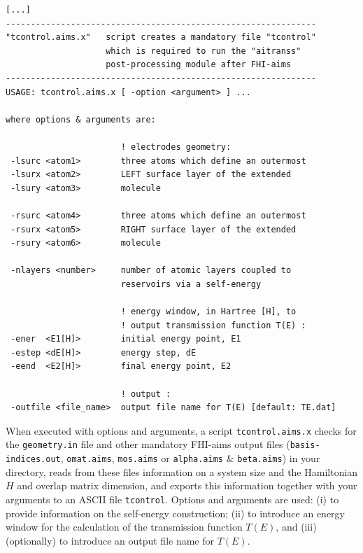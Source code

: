 \begin{verbatim}
[...]
--------------------------------------------------------------
"tcontrol.aims.x"   script creates a mandatory file "tcontrol"
                    which is required to run the "aitranss"
                    post-processing module after FHI-aims
--------------------------------------------------------------
USAGE: tcontrol.aims.x [ -option <argument> ] ...

where options & arguments are:

                       ! electrodes geometry:
 -lsurc <atom1>        three atoms which define an outermost
 -lsurx <atom2>        LEFT surface layer of the extended
 -lsury <atom3>        molecule

 -rsurc <atom4>        three atoms which define an outermost
 -rsurx <atom5>        RIGHT surface layer of the extended
 -rsury <atom6>        molecule

 -nlayers <number>     number of atomic layers coupled to 
                       reservoirs via a self-energy

                       ! energy window, in Hartree [H], to
                       ! output transmission function T(E) :
 -ener  <E1[H]>        initial energy point, E1
 -estep <dE[H]>        energy step, dE
 -eend  <E2[H]>        final energy point, E2

                       ! output :
 -outfile <file_name>  output file name for T(E) [default: TE.dat]

\end{verbatim}

When executed with options and arguments, a script \verb,tcontrol.aims.x,
checks for the \verb,geometry.in, file and other mandatory FHI-aims
output files (\verb,basis-indices.out,, \verb,omat.aims,, \verb,mos.aims,
or \verb,alpha.aims, \& \verb,beta.aims,) in your directory, reads from
these files information on a system size and the Hamiltonian $H$ and
overlap matrix dimension, and exports this information together with
your arguments to an ASCII file \verb,tcontrol,. Options and arguments
are used: (i) to provide information on the self-energy construction;
(ii) to introduce an energy window for the calculation of the transmission
function $T(E)$, and (iii) (optionally) to introduce an output file name
for $T(E)$.

